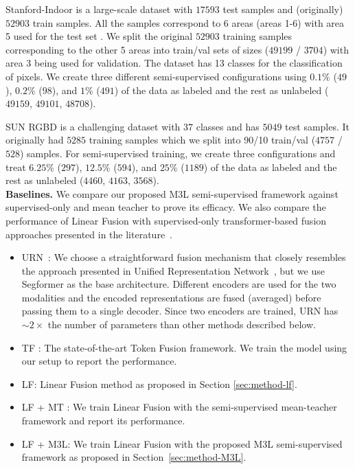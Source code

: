 \documentclass[10pt,twocolumn,letterpaper]{article}
\begin{document}
Stanford-Indoor \cite{stanfordindoor} is a large-scale dataset with $17593$ test samples and (originally) $52903$ train samples. 
All the samples correspond to 6 areas (areas 1-6) with area 5 used for the test set \cite{stanfordindoor}. 
We split the original $52903$ training samples corresponding to the other 5 areas into train/val sets of sizes ($49199$ / $3704$) with area 3 being used for validation. 
The dataset has 13 classes for the classification of pixels. 
We create three different semi-supervised configurations using $0.1\%$ ($49$), $0.2\%$ ($98$), and $1\%$ ($491$) of the data as labeled and the rest as unlabeled ($49159$, $49101$, $48708$).

SUN RGBD is a challenging dataset with $37$ classes and has $5049$ test samples. 
It originally had $5285$ training samples which we split into 90/10 train/val ($4757$ / $528$) samples. 
For semi-supervised training, we create three configurations and treat $6.25\%$ ($297$), $12.5\%$ ($594$), and $25\%$ ($1189$) of the data as labeled and the rest as unlabeled ($4460$, $4163$, $3568$). \\

\noindent\textbf{Baselines.} We compare our proposed M3L semi-supervised framework against supervised-only and mean teacher \cite{mt} to prove its efficacy. We also compare the performance of Linear Fusion with supervised-only transformer-based fusion approaches presented in the literature~\cite{tokenfusion, urn}. 
\begin{itemize}[leftmargin=*]
    \item URN~\cite{urn}: We choose a straightforward fusion mechanism that closely resembles the approach presented in Unified Representation Network~\cite{urn}, but we use Segformer as the base architecture. Different encoders are used for the two modalities and the encoded representations are fused (averaged) before passing them to a single decoder. Since two encoders are trained, URN has $\sim2\times$ the number of parameters than other methods described below.
    \item TF \cite{tokenfusion}: The state-of-the-art Token Fusion \cite{tokenfusion} framework. We train the model using our setup to report the performance.
    \item LF: Linear Fusion method as proposed in Section \ref{sec:method-lf}.
    \item LF + MT \cite{mt}: We train Linear Fusion with the semi-supervised mean-teacher \cite{mt} framework and report its performance. 
    \item LF + M3L: We train Linear Fusion with the proposed M3L semi-supervised framework as proposed in Section~\ref{sec:method-M3L}.
\end{itemize}
\end{document}

